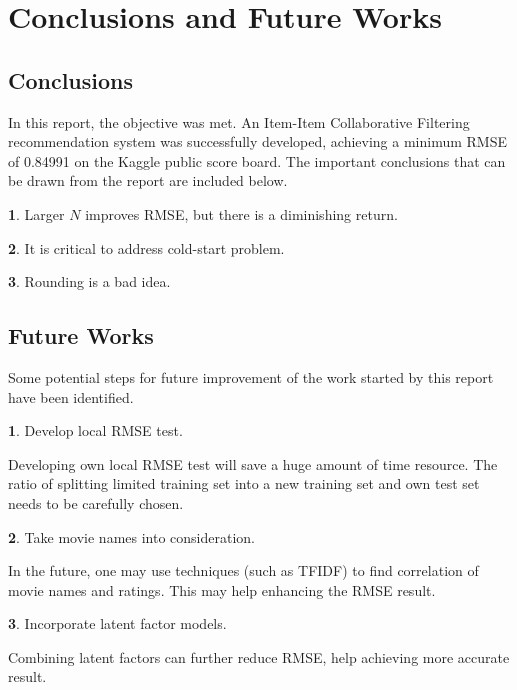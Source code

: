 \documentclass{ece}
\begin{document}
\newpage
\section{Conclusions and Future Works}

\subsection{Conclusions}

In this report, the objective was met.
An Item-Item Collaborative Filtering recommendation system was successfully developed, achieving a minimum RMSE of 0.84991 on the Kaggle public score board.
The important conclusions that can be drawn from the report are included below.

\textbf{1}. Larger $N$ improves RMSE, but there is a diminishing return.

\textbf{2}. It is critical to address cold-start problem.

\textbf{3}. Rounding is a bad idea.

\subsection{Future Works}

Some potential steps for future improvement of the work started by this report have been identified.

\textbf{1}. Develop local RMSE test.

Developing own local RMSE test will save a huge amount of time resource. The ratio of splitting limited training set into a new training set and own test set needs to be carefully chosen. 

\textbf{2}. Take movie names into consideration.

In the future, one may use techniques (such as TFIDF) to find correlation of movie names and ratings.
This may help enhancing the RMSE result.

\textbf{3}. Incorporate latent factor models.

Combining latent factors can further reduce RMSE, help achieving more accurate result.

\end{document}
